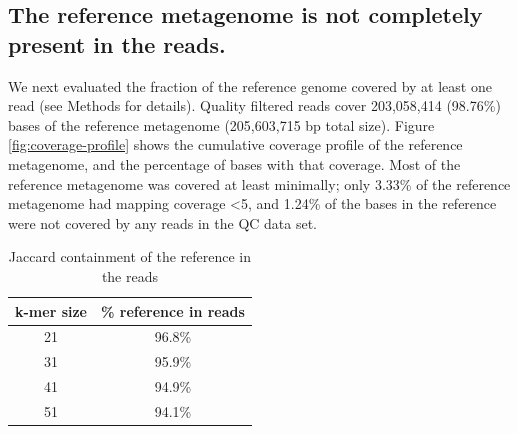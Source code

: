 \documentclass[11pt]{article}
\begin{document}


\subsection*{The reference metagenome is not completely present in the reads.}

We next evaluated the fraction of the reference genome covered by at least
one read (see Methods for details). Quality filtered reads cover
203,058,414 (98.76\%) bases of the reference metagenome (205,603,715
bp total size).  Figure \ref{fig:coverage-profile} shows the
cumulative coverage profile of the reference metagenome, and the
percentage of bases with that coverage. Most of the reference
metagenome was covered at least minimally; only 3.33\% of the
reference metagenome had mapping coverage \textless 5, and 1.24\% of
the bases in the reference were not covered by any reads in the QC data
set.

\begin{table}[t]
\caption{Jaccard containment of the reference in the reads}
\centering
\begin{tabular}{|c|c|}
\hline
\textbf{k-mer size} & {\textbf \% reference in reads } \\ [0.5ex]
\hline
21 & 96.8\% \\
\hline
31 & 95.9\% \\
\hline
41 & 94.9\% \\
\hline
51 & 94.1\% \\
\hline
\end{tabular}
\label{table:ref_in_reads}
\end{table}
\end{document}
